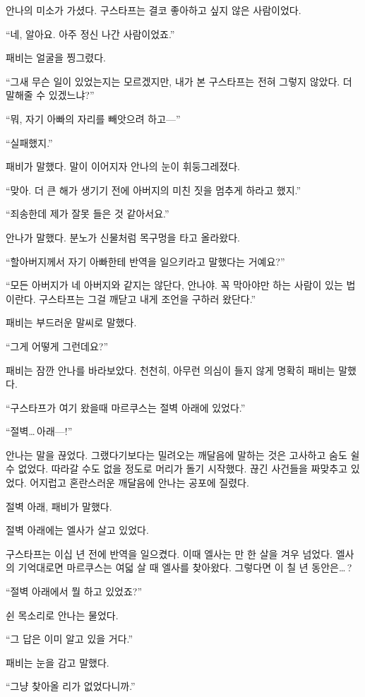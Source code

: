 안나의 미소가 가셨다. 구스타프는 결코 좋아하고 싶지 않은 사람이었다.

``네, 알아요. 아주 정신 나간 사람이었죠.''

패비는 얼굴을 찡그렸다.

``그새 무슨 일이 있었는지는 모르겠지만, 내가 본 구스타프는 전혀 그렇지 않았다. 더 말해줄 수 있겠느냐?''

``뭐, 자기 아빠의 자리를 빼앗으려 하고—''

``실패했지.''

패비가 말했다. 말이 이어지자 안나의 눈이 휘둥그레졌다.

``맞아. 더 큰 해가 생기기 전에 아버지의 미친 짓을 멈추게 하라고 했지.''

``죄송한데 제가 잘못 들은 것 같아서요.''

안나가 말했다. 분노가 신물처럼 목구멍을 타고 올라왔다.

``할아버지께서 자기 아빠한테 반역을 일으키라고 말했다는 거예요?''

``모든 아버지가 네 아버지와 같지는 않단다, 안나야. 꼭 막아야만 하는 사람이 있는 법이란다. 구스타프는 그걸 깨닫고 내게 조언을 구하러 왔단다.''

패비는 부드러운 말씨로 말했다.

``그게 어떻게 그런데요?''

패비는 잠깐 안나를 바라보았다. 천천히, 아무런 의심이 들지 않게 명확히 패비는 말했다.

``구스타프가 여기 왔을때 마르쿠스는 절벽 아래에 있었다.''

``절벽\ldots\,아래—!''

안나는 말을 끊었다. 그랬다기보다는 밀려오는 깨달음에 말하는 것은 고사하고 숨도 쉴 수 없었다. 따라갈 수도 없을 정도로 머리가 돌기 시작했다. 끊긴 사건들을 짜맞추고 있었다. 어지럽고 혼란스러운 깨달음에 안나는 공포에 질렸다.

절벽 아래, 패비가 말했다.

절벽 아래에는 엘사가 살고 있었다.

구스타프는 이십 년 전에 반역을 일으켰다. 이때 엘사는 만 한 살을 겨우 넘었다. 엘사의 기억대로면 마르쿠스는 여덟 살 때 엘사를 찾아왔다. 그렇다면 이 칠 년 동안은\ldots\,?

``절벽 아래에서 뭘 하고 있었죠?''

쉰 목소리로 안나는 물었다.

``그 답은 이미 알고 있을 거다.''

패비는 눈을 감고 말했다.

``그냥 찾아올 리가 없었다니까.''

